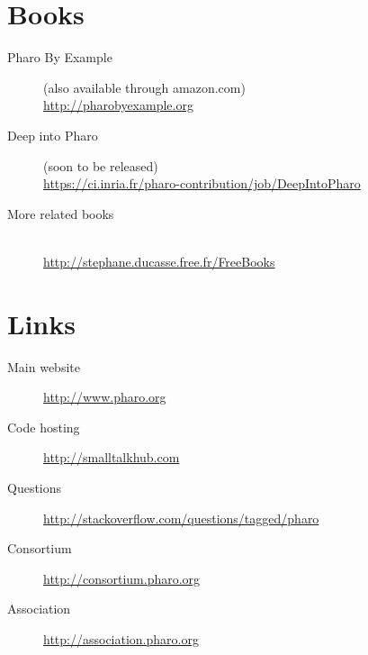 \documentclass[notumble]{leaflet}
\begin{document}
\pagebreak{}

\vspace*{\fill}

\section{Books}


\begin{description}
\item[Pharo By Example]
  (also available through amazon.com)\\
  \url{http://pharobyexample.org}
\item[Deep into Pharo]
  (soon to be released)\\
  \url{https://ci.inria.fr/pharo-contribution/job/DeepIntoPharo}
\item[More related books]~\\
    \url{http://stephane.ducasse.free.fr/FreeBooks}
\end{description}



\section{Links}

\begin{description}
\item[Main website] \url{http://www.pharo.org}
\item[Code hosting] \url{http://smalltalkhub.com}
\item[Questions] \url{http://stackoverflow.com/questions/tagged/pharo}
\item[Consortium] \url{http://consortium.pharo.org}
\item[Association] \url{http://association.pharo.org}
\end{description}

\vfill{}
\end{document}
